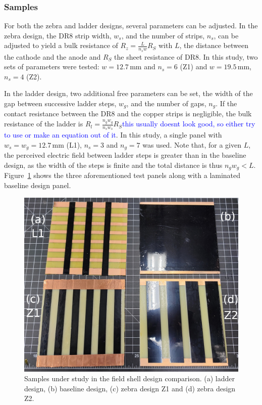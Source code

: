 \documentclass[a4paper,12pt]{article}
\newcommand{\DR}{DR8}
\newcommand{\RI}[1]{\textcolor{blue}{#1}}
\begin{document}


\subsubsection{Samples}

\label{sec:alt_samples}
For both the zebra and ladder designs, several parameters can be adjusted. In the zebra design, the {\DR} strip width, $w_s$, and the number of strips, $n_s$, can be adjusted to yield a bulk resistance of $R_z=\frac{L}{n_sw}R_S$ with $L$, the distance between the cathode and the anode and $R_S$ the sheet resistance of {\DR}. In this study, two sets of parameters were tested: $w=12.7\,$mm and $n_s=6$ (Z1) and $w=19.5$\,mm, $n_s=4$ (Z2).

In the ladder design, two additional free parameters can be set, the width of the gap between successive ladder steps, $w_g$, and the number of gaps, $n_g$. If the contact resistance between the {\DR} and the copper strips is negligible, the bulk resistance of the ladder is $R_l=\frac{n_gw_g}{n_sw_s}R_S$\RI{this usually doesnt look good, so either try to use \sfrac{1}{2} or make an equation out of it}. In this study, a single panel with $w_s=w_g=12.7\,$mm (L1), $n_s=3$ and $n_g=7$ was used. Note that, for a given $L$, the perceived electric field between ladder steps is greater than in the baseline design, as the width of the steps is finite and the total distance is thus $n_gw_g<L$. Figure~\ref{fig:shell_designs_picture} shows the three aforementioned test panels along with a laminated baseline design panel.

\begin{figure}[htbp]
\centering
\includegraphics[width=.75\linewidth]{field_shell_designs.jpg}
\caption{Samples under study in the field shell design comparison. (a) ladder design, (b) baseline design, (c) zebra design Z1 and (d) zebra design Z2.}
\label{fig:shell_designs_picture}
\end{figure}
\end{document}
